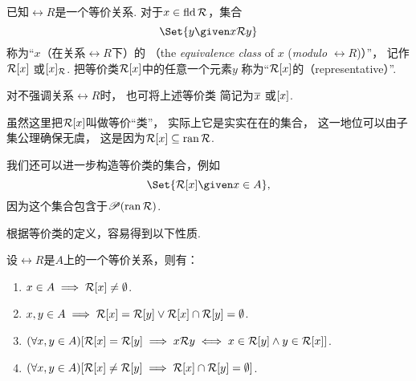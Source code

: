 \begin{definition}
已知\(\rel{R}\)是一个等价关系.
对于\(x \in \operatorname{fld} \mathcal{R}\)，集合\begin{equation*}
	\Set{ y \given x \rel{R} y }
\end{equation*}
称为“\(x\)（在关系\(\rel{R}\)下）的%
（the \emph{equivalence class} of \(x\) (\emph{modulo} \(\rel{R}\))）”，
记作\(\EquivalenceClassBH{x}[\rel{R}]\)
或\(\EquivalenceClassBT{x}[\rel{R}]\).
把等价类\(\EquivalenceClassBH{x}[\rel{R}]\)中的任意一个元素\(y\)
称为“\(\EquivalenceClassBH{x}[\rel{R}]\)的（representative）”.

对不强调关系\(\rel{R}\)时，
也可将上述等价类
简记为\(\EquivalenceClassO{x}\)
或\(\EquivalenceClassB{x}\).
\end{definition}

虽然这里把\(\EquivalenceClassBH{x}[\rel{R}]\)叫做等价“类”，
实际上它是实实在在的集合，
这一地位可以由子集公理确保无虞，
这是因为\(\EquivalenceClassBH{x}[\rel{R}] \subseteq \ran \rel{R}\).

我们还可以进一步构造等价类的集合，例如\begin{equation*}
	\Set{ \EquivalenceClassBH{x}[\rel{R}] \given x \in A },
\end{equation*}
因为这个集合包含于\(\mathscr{P}(\operatorname{ran} \mathcal{R})\).

根据等价类的定义，容易得到以下性质.
\begin{property}
设\(\rel{R}\)是\(A\)上的一个等价关系，则有：
\begin{enumerate}
	\item \(x \in A
	\implies \EquivalenceClassBH{x}[\rel{R}] \neq \emptyset\).

	\item \(x,y \in A
	\implies \EquivalenceClassBH{x}[\rel{R}] = \rel{R}[y]
	\lor \EquivalenceClassBH{x}[\rel{R}] \cap \rel{R}[y] = \emptyset\).

	\item \((\forall x,y \in A)
	[
		\EquivalenceClassBH{x}[\rel{R}] = \rel{R}[y]
		\implies
		x \rel{R} y
		\iff
		x \in \rel{R}[y] \land y \in \EquivalenceClassBH{x}[\rel{R}]
	]\).

	\item \((\forall x,y \in A)
	[
		\EquivalenceClassBH{x}[\rel{R}] \neq \rel{R}[y]
		\implies
		\EquivalenceClassBH{x}[\rel{R}] \cap \rel{R}[y] = \emptyset
	]\).
\end{enumerate}
\end{property}


